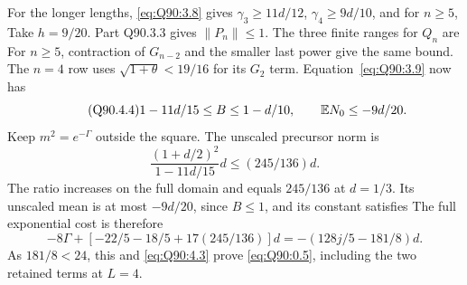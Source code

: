 For the longer lengths, \eqref{eq:Q90:3.8} gives
\(\gamma_3\ge\allowbreak 11d/12\), \(\gamma_4\ge\allowbreak 9d/10\), and for \(n\ge\allowbreak 5\),
Take \(h=\allowbreak 9/20\). Part Q90.3.3 gives \(\|P_n\|\le\allowbreak 1\).
The three finite ranges for \(Q_n\) are
For \(n\ge\allowbreak 5\), contraction of \(G_{n-2}\) and the smaller last power
give the same bound. The \(n=\allowbreak 4\) row uses
\(\sqrt{1+\theta}<\allowbreak 19/16\) for its \(G_2\) term.
Equation~\eqref{eq:Q90:3.9} now has
\begin{equation}\tag{Q90.4.4}\label{eq:Q90:4.4}
1-11d/15\le B\le1-d/10,\qquad\mathbb E N_0\le-9d/20.
\end{equation}
Keep \(m^2=\allowbreak e^{-\Gamma}\) outside the square. The unscaled precursor norm is
\begin{equation}\tag{Q90.4.5}\label{eq:Q90:4.5}
\frac{(1+d/2)^2}{1-11d/15}d\le(245/136)d.
\end{equation}
The ratio increases on the full domain and equals \(245/136\)
at \(d=\allowbreak 1/3\). Its unscaled mean is at most \(-9d/20\), since
\(B\le\allowbreak 1\), and its constant satisfies
The full exponential cost is therefore
\begin{equation}\tag{Q90.4.6}\label{eq:Q90:4.6}
-8\Gamma+[-22/5-18/5+17(245/136)]d
=-(128j/5-181/8)d.
\end{equation}
As \(181/8<\allowbreak 24\), this and \eqref{eq:Q90:4.3} prove
\eqref{eq:Q90:0.5}, including the two retained terms at \(L=\allowbreak 4\).

